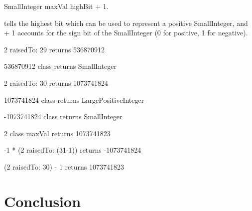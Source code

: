 \documentclass[a4paper,10pt,twoside]{book}
\begin{document}
\begin{code}
SmallInteger maxVal highBit + 1.
\end{code}

 tells the highest bit which can be used to
represent a positive SmallInteger, and + 1 accounts for the sign bit
of the SmallInteger (0 for positive, 1 for negative).



\begin{code}{}
2 raisedTo: 29 
	returns 536870912 

536870912 class
	returns SmallInteger

2 raisedTo: 30 
	returns 1073741824

1073741824 class
	returns LargePositiveInteger

-1073741824 class 
	returns SmallInteger

2 class maxVal 
	returns 1073741823

-1 * (2 raisedTo: (31-1)) 
	returns -1073741824
	
(2 raisedTo: 30) - 1
	returns 1073741823
\end{code}








\section{Conclusion}

\ifx\wholebook\relax\else
   
   
\end{document}
